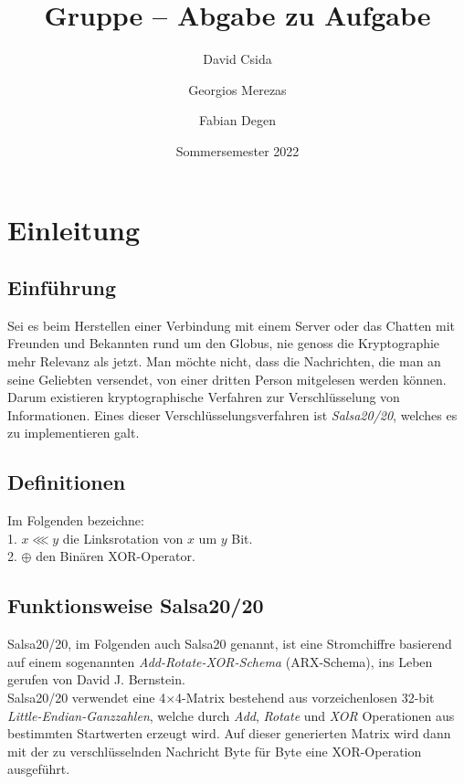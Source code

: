 \documentclass[course=erap]{aspdoc}
\author{David Csida \and Georgios Merezas \and Fabian Degen}
\date{Sommersemester 2022} %
\title{Gruppe \theGroup{} -- Abgabe zu Aufgabe \theNumber}
\begin{document}
\maketitle

\section{Einleitung}
\subsection{Einführung}
Sei es beim Herstellen einer Verbindung mit einem Server oder das Chatten mit Freunden und Bekannten rund um
den Globus, nie genoss die Kryptographie mehr Relevanz als jetzt. Man möchte nicht, dass die Nachrichten,
die man an seine Geliebten versendet, von einer dritten Person mitgelesen werden können. Darum existieren
kryptographische Verfahren zur Verschlüsselung von Informationen. Eines dieser Ver\-schlüsselungs\-ver\-fahren ist
\emph{Salsa20/20}, welches es zu implementieren galt.

\subsection{Definitionen}
Im Folgenden bezeichne: 
\\ \hspace*{5mm} 1. $x \lll y$ die Linksrotation von $x$ um $y$ Bit. 
\\ \hspace*{5mm} 2. $\oplus$ den Binären XOR-Operator.

\subsection{Funktionsweise Salsa20/20}
Salsa20/20, im Folgenden auch Salsa20 genannt, ist eine Stromchiffre basierend auf einem sogenannten 
\emph{Add-Rotate-XOR-Schema} (ARX-Schema), ins Leben gerufen von David J. Bernstein.\\
Salsa20/20 verwendet eine 4$\times$4-Matrix bestehend aus vorzeichenlosen 32-bit \emph{Little-Endian-Ganzzahlen},
welche durch \emph{Add}, \emph{Rotate} und \emph{XOR} Operationen aus bestimmten Startwerten erzeugt wird.
Auf dieser generierten Matrix wird dann mit der zu ver\-schlü\-ssel\-nden Nachricht Byte für 
Byte eine XOR-Operation ausgeführt.
\end{document}
